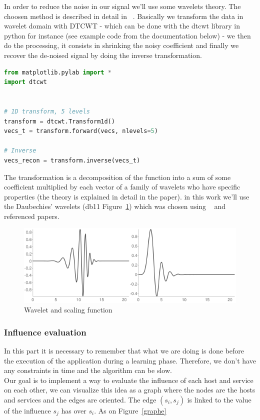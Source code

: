\documentclass[10pt,a4paper,oneside]{article}
\begin{document}
\vspace{0.8cm}

\begin{multicols}{2}
In order to reduce the noise in our signal we'll use some wavelets theory. The choosen method is described in detail in ~\cite{ref1}. Basically we transform the data in wavelet domain with DTCWT - which can be done with the dtcwt library in python for instance (see example code from the documentation below) - we then do the processing, it consists in shrinking the noisy coefficient and finally we recover the de-noised signal by doing the inverse transformation.
\end{multicols}
\begin{lstlisting}[language=Python, caption=Python dtcwt library example]
from matplotlib.pylab import *
import dtcwt


# 1D transform, 5 levels
transform = dtcwt.Transform1d()
vecs_t = transform.forward(vecs, nlevels=5)

# Inverse
vecs_recon = transform.inverse(vecs_t)
\end{lstlisting}


\begin{multicols}{2}
The transformation is a decomposition of the function into a sum of some coefficient multiplied by each vector of a family of wavelets who have specific properties (the theory is explained in detail in the paper). in this work we'll use the Daubechies' wavelets (db11 Figure~\ref{db}) which was chosen using ~\cite{ref2} and referenced papers.
\end{multicols}

\begin{figure}[!h]
\centering
\includegraphics[scale=0.67]{./images/PNG/db11.png}
\caption{Wavelet and scaling function}
\label{db}
\end{figure}

\begin{multicols}{2}
\subsubsection{Influence evaluation}
In this part it is necessary to remember that what we are doing is done before the execution of the application during a learning phase. Therefore, we don't have any constraints in time and the algorithm can be slow.
\\
Our goal is to implement a way to evaluate the influence of each host and service on each other, we can visualize this idea as a graph where the nodes are the hosts and services and the edges are oriented. The edge $(s_i,s_j)$ is linked to the value of the influence $s_j$ has over $s_i$. As on Figure~\ref{graphe}
\end{multicols}
\end{document}

